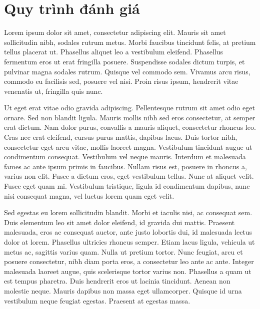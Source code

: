 \section{Quy trình đánh giá}
Lorem ipsum dolor sit amet, consectetur adipiscing elit. Mauris sit amet sollicitudin nibh, sodales rutrum metus. Morbi faucibus tincidunt felis, at pretium tellus placerat ut. Phasellus aliquet leo a vestibulum eleifend. Phasellus fermentum eros ut erat fringilla posuere. Suspendisse sodales dictum turpis, et pulvinar magna sodales rutrum. Quisque vel commodo sem. Vivamus arcu risus, commodo eu facilisis sed, posuere vel nisi. Proin risus ipsum, hendrerit vitae venenatis ut, fringilla quis nunc.

Ut eget erat vitae odio gravida adipiscing. Pellentesque rutrum sit amet odio eget ornare. Sed non blandit ligula. Mauris mollis nibh sed eros consectetur, at semper erat dictum. Nam dolor purus, convallis a mauris aliquet, consectetur rhoncus leo. Cras nec erat eleifend, cursus purus mattis, dapibus lacus. Duis tortor nibh, consectetur eget arcu vitae, mollis laoreet magna. Vestibulum tincidunt augue ut condimentum consequat. Vestibulum vel neque mauris. Interdum et malesuada fames ac ante ipsum primis in faucibus. Nullam risus est, posuere in rhoncus a, varius non elit. Fusce a dictum eros, eget vestibulum tellus. Nunc at aliquet velit. Fusce eget quam mi. Vestibulum tristique, ligula id condimentum dapibus, nunc nisi consequat magna, vel luctus lorem quam eget velit.

Sed egestas eu lorem sollicitudin blandit. Morbi et iaculis nisi, ac consequat sem. Duis elementum leo sit amet dolor eleifend, id gravida dui mattis. Praesent malesuada, eros ac consequat auctor, ante justo lobortis dui, id malesuada lectus dolor at lorem. Phasellus ultricies rhoncus semper. Etiam lacus ligula, vehicula ut metus ac, sagittis varius quam. Nulla ut pretium tortor. Nunc feugiat, arcu et posuere consectetur, nibh diam porta eros, a consectetur leo ante ac ante. Integer malesuada laoreet augue, quis scelerisque tortor varius non. Phasellus a quam ut est tempus pharetra. Duis hendrerit eros ut lacinia tincidunt. Aenean non molestie neque. Mauris dapibus non massa eget ullamcorper. Quisque id urna vestibulum neque feugiat egestas. Praesent at egestas massa.

